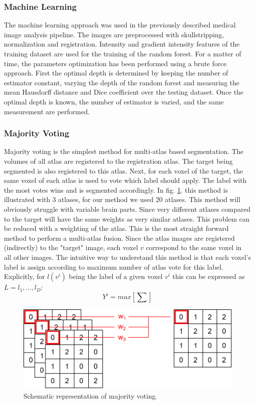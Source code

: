 \subsubsection*{Machine Learning}
The machine learning approach was used in the previously described medical image analysis pipeline. The images are preprocessed with skullstripping, normalization and registration. Intensity and gradient intensity features of the training dataset are used for the training of the random forest. 
For a matter of time, the parameters optimization has been performed using a brute force approach. First the optimal depth is determined by keeping the number of estimator constant, varying the depth of the random forest and measuring the mean Hausdorff distance and Dice coefficient over the testing dataset. Once the optimal depth is known, the number of estimator is varied, and the same measurement are performed.

\subsubsection*{Majority Voting}
Majority voting is the simplest method for multi-atlas based segmentation. The volumes of all atlas are registered to the registration atlas. The target being segmented is also registered to this atlas. Next, for each voxel of the target, the same voxel of each atlas is used to vote which label should apply. The label with the most votes wins and is segmented accordingly. In fig. \ref{fig:majorityVoting}. this method is illustrated with 3 atlases, for our method we used 20 atlases. This method will obviously struggle with variable brain parts. Since very different atlases compared to the target will have the same weights as very similar atlases. This problem can be reduced with a weighting of the atlas.
This is the most straight forward method to perform a multi-atlas fusion. Since the atlas images are registered (indirectly) to the "target" image, each voxel $v$ correspond to the same voxel in all other images. The intuitive way to understand this method is that each voxel's label is assign according to maximum number of atlas vote for this label. Explicitly, for $l(v^{i})$ being the label of a given voxel $v^{i}$ this can be expressed as $L={l_1, ... , l_D}$:
\[ Y^{i}=max[\sum{}] \]


\begin{figure}[h!]
	\centering
	\includegraphics[width=0.8\linewidth]{img/majorityVoting2}
	\caption{Schematic representation of majority voting.}
	\label{fig:majorityVoting}
\end{figure}

